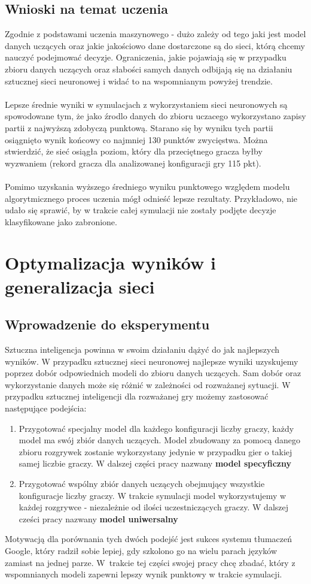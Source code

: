 \documentclass[12pt, oneside]{report}
\begin{document}
	\section{Wnioski na temat uczenia}
	Zgodnie z podstawami uczenia maszynowego - dużo zależy od tego jaki jest model danych uczących oraz jakie jakościowo dane dostarczone są do sieci, którą chcemy nauczyć podejmować decyzje. Ograniczenia, jakie pojawiają się w przypadku zbioru danych uczących oraz słabości samych danych odbijają się na działaniu sztucznej sieci neuronowej i widać to na wspomnianym powyżej trendzie. \\ \\ 
	Lepsze średnie wyniki w symulacjach z wykorzystaniem sieci neuronowych są spowodowane tym, że jako źrodlo danych do zbioru uczacego wykorzystano zapisy partii z najwyższą zdobyczą punktową. Starano się by wyniku tych partii osiągnięto wynik końcowy co najmniej 130 punktów zwycięstwa. Można stwierdzić, że sieć osiągła poziom, który dla przeciętnego gracza byłby wyzwaniem (rekord gracza dla analizowanej konfiguracji gry 115 pkt).
	\\ \\
	Pomimo uzyskania wyższego średniego wyniku punktowego względem modelu algorytmicznego proces uczenia mógł odnieść lepsze rezultaty. Przykładowo, nie udało się sprawić, by w trakcie całej symulacji nie zostały podjęte decyzje klasyfikowane jako zabronione. 
	\chapter{Optymalizacja wyników i generalizacja sieci}
	\section{Wprowadzenie do eksperymentu}
	\label{ch:compare_data}
	Sztuczna inteligencja powinna w swoim działaniu dążyć do jak najlepszych wyników. W przypadku sztucznej sieci neuronowej najlepsze wyniki uzyskujemy poprzez dobór odpowiednich modeli do zbioru danych uczących. Sam dobór oraz wykorzystanie danych może się różnić w zależności od rozważanej sytuacji. W przypadku sztucznej inteligencji dla rozważanej gry możemy zastosować następujące podejścia:
	
	\begin{enumerate}
		\item Przygotować specjalny model dla każdego konfiguracji liczby graczy, każdy model ma swój zbiór danych uczących. Model zbudowany za pomocą danego zbioru rozgrywek zostanie wykorzystany jedynie w przypadku gier o takiej samej liczbie graczy. W dalszej części pracy nazwany \textbf{model specyficzny}
		\item Przygotować wspólny zbiór danych uczących obejmujący wszystkie konfiguracje liczby graczy. W trakcie symulacji model wykorzystujemy w każdej rozgrywce - niezależnie od ilości uczestniczących graczy. W dalszej cześci pracy nazwany \textbf{model uniwersalny}
	\end{enumerate}
	Motywacją dla porównania tych dwóch podejść jest sukces systemu tłumaczeń Google, który radził sobie lepiej, gdy szkolono go na wielu parach języków zamiast na jednej parze. W~trakcie tej części swojej pracy chcę zbadać, który z wspomnianych modeli zapewni lepszy wynik punktowy w trakcie symulacji.
\end{document}
